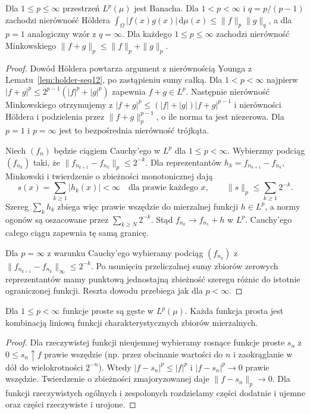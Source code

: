 \begin{twierdzenie}
\label{thm:lp-banach12}
Dla $1\le p\le\infty$ przestrzeń $L^p(\mu)$ jest Banacha.
Dla $1<p<\infty$ i $q=p/(p-1)$ zachodzi nierówność H\"oldera
$\int_\Omega|f(x)g(x)|\,\mathrm d\mu(x)\le\|f\|_p\|g\|_q$,
a dla $p=1$ analogiczny wzór z $q=\infty$.
Dla każdego $1\le p\le\infty$ zachodzi nierówność Minkowskiego
$\|f+g\|_p\le\|f\|_p+\|g\|_p$.
\end{twierdzenie}
\begin{proof}
Dowód H\"oldera powtarza argument z nierównością Younga
z Lematu~\ref{lem:holder-seq12}, po zastąpieniu sumy całką.
Dla $1<p<\infty$ najpierw $|f+g|^p\le2^{p-1}(|f|^p+|g|^p)$
zapewnia $f+g\in L^p$. Następnie nierówność Minkowskiego
otrzymujemy z $|f+g|^p\le(|f|+|g|)|f+g|^{p-1}$
i nierówności H\"oldera
i podzielenia przez $\|f+g\|_p^{p-1}$, o ile norma ta jest
niezerowa. Dla $p=1$ i $p=\infty$ jest to bezpośrednia
nierówność trójkąta.

Niech $(f_n)$ będzie ciągiem Cauchy'ego w $L^p$ dla
$1\le p<\infty$. Wybierzmy podciąg $(f_{n_k})$ taki, że
$\|f_{n_{k+1}}-f_{n_k}\|_p\le2^{-k}$.
Dla reprezentantów $h_k=f_{n_{k+1}}-f_{n_k}$,
Minkowski i twierdzenie o zbieżności monotonicznej dają
\[
 s(x)=\sum_{k\ge1}|h_k(x)|<\infty\quad\text{dla prawie każdego }x,
 \qquad \|s\|_p\le\sum_{k\ge1}2^{-k}.
\]
Szereg $\sum_kh_k$ zbiega więc prawie wszędzie do mierzalnej
funkcji $h\in L^p$, a normy ogonów są oszacowane przez
$\sum_{k\ge N}2^{-k}$. Stąd $f_{n_k}\to f_{n_1}+h$ w $L^p$.
Cauchy'ego całego ciągu zapewnia tę samą granicę.

Dla $p=\infty$ z warunku Cauchy'ego wybieramy podciąg
$(f_{n_k})$ z $\|f_{n_{k+1}}-f_{n_k}\|_\infty\le2^{-k}$.
Po usunięciu przeliczalnej sumy zbiorów zerowych
reprezentantów mamy punktową jednostajną zbieżność
szeregu różnic do istotnie ograniczonej funkcji.
Reszta dowodu przebiega jak dla $p<\infty$.
\end{proof}

\begin{lemat}
\label{lem:simple-dense12}
Dla $1\le p<\infty$ funkcje proste są gęste w $L^p(\mu)$.
Każda funkcja prosta jest kombinacją liniową funkcji charakterystycznych
zbiorów mierzalnych.
\end{lemat}
\begin{proof}
Dla rzeczywistej funkcji nieujemnej wybieramy rosnące funkcje
proste $s_n$ z $0\le s_n\uparrow f$ prawie wszędzie
(np. przez obcinanie wartości do $n$ i zaokrąglanie w dół
do wielokrotności $2^{-n}$). Wtedy
$|f-s_n|^p\le|f|^p$ i $|f-s_n|^p\to0$ prawie wszędzie.
Twierdzenie o zbieżności zmajoryzowanej daje
$\|f-s_n\|_p\to0$. Dla funkcji rzeczywistych ogólnych
i zespolonych rozdzielamy części dodatnie i ujemne
oraz części rzeczywiste i urojone.
\end{proof}

